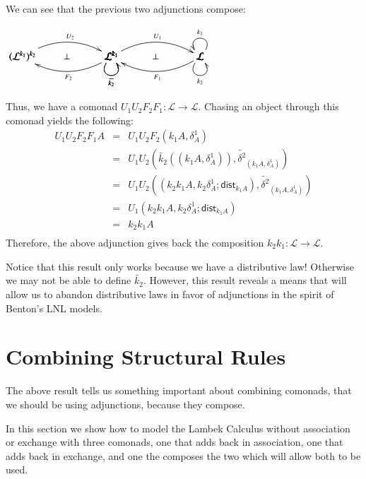 \documentclass{article}
\let\mto\to
\let\to\relax
\newcommand{\to}{\rightarrow}
\newcommand{\cat}[1]{\mathcal{#1}}
\begin{document}
We can see that the previous two adjunctions compose:
\begin{center}
  \begin{math}
    \bfig
    \Loop(900,0)\cat{L}^{k_1}(dl,dr)_{\widetilde{k_2}}
    \morphism(0,0)|a|/{@{>}@/^1.5em/}/<900,0>[(\cat{L}^{k_1})^{k_2}`\cat{L}^{k_1};U_2]
    \morphism(0,0)|b|/{@{<-}@/_1.5em/}/<900,0>[(\cat{L}^{k_1})^{k_2}`\cat{L}^{k_1};F_2]
    \place(450,0)[\perp]
    
    \Loop(1800,0)\cat{L}(ur,ul)_{k_1}
    \Loop(1800,0)\cat{L}(dl,dr)_{k_2}
    \Loop(900,0)\cat{L}^{k_1}(dl,dr)_{\widetilde{k_2}}
    \morphism(900,0)|a|/{@{>}@/^1.5em/}/<900,0>[\cat{L}^{k_1}`\cat{L};U_1]
    \morphism(900,0)|b|/{@{<-}@/_1.5em/}/<900,0>[\cat{L}^{k_1}`\cat{L};F_1]
    \place(1350,0)[\perp]    
    \efig
  \end{math}
\end{center}
Thus, we have a comonad $U_1U_2F_2F_1 : \cat{L} \mto \cat{L}$.
Chasing an object through this comonad yields the following:
\[
\begin{array}{lll}
  U_1U_2F_2F_1A
  & = & U_1U_2F_2(k_1A,\delta^1_A)\\
  & = & U_1U_2(\widetilde{k_2}((k_1A,\delta^1_A)), \widetilde{\delta^2}_{(k_1A,\delta^1_A)})\\
  & = & U_1U_2((k_2k_1A,k_2\delta^1_A;\mathsf{dist}_{k_1 A}), \widetilde{\delta^2}_{(k_1A,\delta^1_A)})\\
  & = & U_1(k_2k_1A,k_2\delta^1_A;\mathsf{dist}_{k_1 A})\\
  & = & k_2k_1A\\  
\end{array}
\]
Therefore, the above adjunction gives back the composition $k_2k_1 :
\cat{L} \mto \cat{L}$.

Notice that this result only works because we have a distributive law!
Otherwise we may not be able to define $\widetilde{k_2}$.  However,
this result reveals a means that will allow us to abandon distributive
laws in favor of adjunctions in the spirit of Benton's LNL models.


\section{Combining Structural Rules}
\label{sec:combining_structural_rules}
The above result tells us something important about combining
comonads, that we should be using adjunctions, because they compose.

In this section we show how to model the Lambek Calculus without
association or exchange with three comonads, one that adds back in
association, one that adds back in exchange, and one the composes the
two which will allow both to be used.


\nocite{*} 

\end{document}
